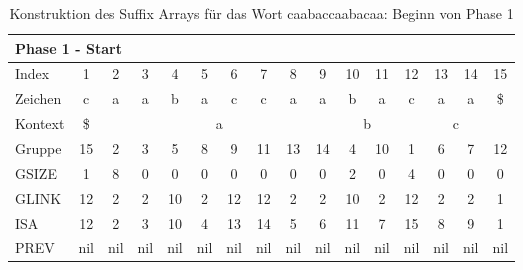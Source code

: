 \begin{table}[H]
\centering
\begin{adjustbox}{max width=\textwidth}
\begin{tabular}{lccccccccccccccc}
\multicolumn{16}{l}{Phase 1 - Start}                                                                                                                                                         \\ \hline
\multicolumn{1}{l|}{Index}   & 1                       & 2   & 3   & 4   & 5   & 6   & 7   & 8   & 9                       & 10  & 11                      & 12  & 13  & 14  & 15  \\
\multicolumn{1}{l|}{Zeichen} & c                       & a   & a   & b   & a   & c   & c   & a   & a                       & b   & a                       & c   & a   & a   & \$  \\ \cline{1-16}
\multicolumn{1}{l|}{Kontext} & \multicolumn{1}{c|}{\$} & \multicolumn{8}{c|}{a}                                            & \multicolumn{2}{c|}{b}        & \multicolumn{4}{c}{c} \\
\multicolumn{1}{l|}{Gruppe}      & \multicolumn{1}{c|}{15} & 2   & 3   & 5   & 8   & 9   & 11  & 13  & \multicolumn{1}{c|}{14} & 4   & \multicolumn{1}{c|}{10} & 1   & 6   & 7   & 12  \\
\multicolumn{1}{l|}{GSIZE}   & \multicolumn{1}{c|}{1}  & 8   & 0   & 0   & 0   & 0   & 0   & 0   & \multicolumn{1}{c|}{0}  & 2   & \multicolumn{1}{c|}{0}  & 4   & 0   & 0   & 0   \\
\multicolumn{1}{l|}{GLINK}   & 12                      & 2   & 2   & 10  & 2   & 12  & 12  & 2   & 2                       & 10  & 2                       & 12  & 2   & 2   & 1   \\
\multicolumn{1}{l|}{ISA}     & 12                      & 2   & 3   & 10  & 4   & 13  & 14  & 5   & 6                       & 11  & 7                       & 15  & 8   & 9   & 1   \\
\multicolumn{1}{l|}{PREV}    & nil                     & nil & nil & nil & nil & nil & nil & nil & nil                     & nil & nil                     & nil & nil & nil & nil
\end{tabular}
\end{adjustbox}

\caption[Konstruktion des Suffix Arrays f{\"u}r das Wort caabaccaabacaa: Beginn von Phase 1]{Konstruktion des Suffix Arrays f{\"u}r das Wort caabaccaabacaa: Beginn von Phase 1}
\label{table_complex_example_1_start} 
\end{table}

